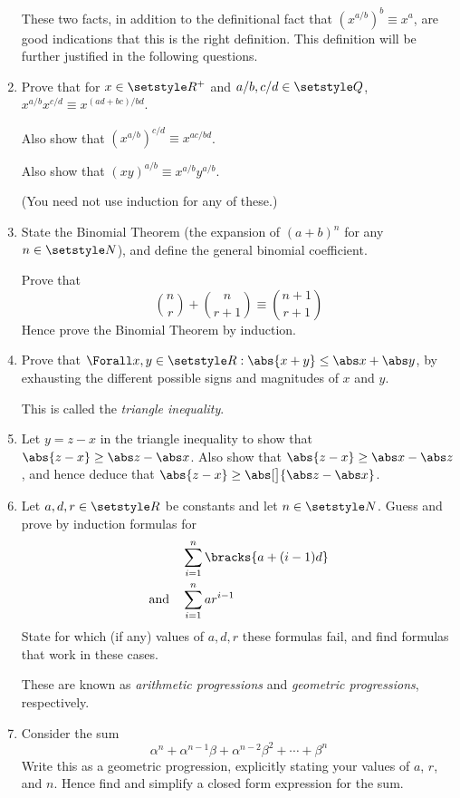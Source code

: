 \begin{enumerate}
  These two facts, in addition to the definitional fact that \((x^{a/b})^b
  \equiv x^a\), are good indications that this is the right definition. This
  definition will be further justified in the following questions.
 \item
  Prove that for \(x \in \Reals^+\) and \(a/b, c/d \in \Rationals\),
  \(x^{a/b} x^{c/d} \equiv x^{(ad + bc)/bd}\).

  Also show that \((x^{a/b})^{c/d} \equiv x^{ac/bd}\).

  Also show that \((xy)^{a/b} \equiv x^{a/b} y^{a/b}\).

  (You need not use induction for any of these.)
 \item
  State the Binomial Theorem
  (the expansion of \((a + b)^n\) for any \(n \in \Naturals\)), and define the
  general binomial coefficient.

  Prove that
  \begin{equation*}
   \binom nr + \binom n{r + 1} \equiv \binom{n + 1}{r + 1}
  \end{equation*}
  Hence prove the Binomial Theorem by induction.
 \item
  Prove that \(\Forall x, y \in \Reals : \abs{x + y} \le \abs x + \abs y\), by
  exhausting the different possible signs and magnitudes of \(x\) and \(y\).

  This is called the \emph{triangle inequality}.
 \item
  Let \(y = z - x\) in the triangle inequality to show that
  \(\abs{z - x} \ge \abs z - \abs x\). Also show that
  \(\abs{z - x} \ge \abs x - \abs z\), and hence deduce that
  \(\abs{z - x} \ge \abs[\big]{\abs z - \abs x}\).
 \item
  Let \(a, d, r \in \Reals\) be constants and let \(n \in \Naturals\).
  Guess and prove by induction formulas for
  \begin{align*}
   &\sum_{i = 1}^n \bracks{a + (i - 1)d} \\
   \text{and}\quad&\sum_{i = 1}^n ar^{i - 1}
  \end{align*}
  State for which (if any) values of \(a, d, r\) these formulas fail, and find
  formulas that work in these cases.

  These are known as \emph{arithmetic progressions} and
  \emph{geometric progressions}, respectively.
 \item
  Consider the sum
  \begin{equation*}
   \alpha^n + \alpha^{n - 1}\beta + \alpha^{n - 2}\beta^2 + \dotsb + \beta^n
  \end{equation*}
  Write this as a geometric progression, explicitly stating your values of
  \(a\), \(r\), and \(n\). Hence find and simplify a closed form expression for
  the sum.


\end{enumerate}
